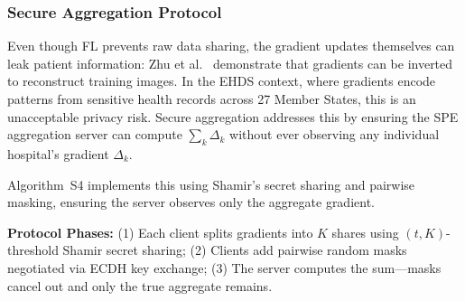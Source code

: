 \documentclass[conference]{IEEEtran}
\begin{document}
\subsubsection{Secure Aggregation Protocol}

Even though FL prevents raw data sharing, the gradient updates themselves can leak patient information: Zhu et al.~\cite{zhu2019deep} demonstrate that gradients can be inverted to reconstruct training images. In the EHDS context, where gradients encode patterns from sensitive health records across 27 Member States, this is an unacceptable privacy risk. Secure aggregation addresses this by ensuring the SPE aggregation server can compute $\sum_k \Delta_k$ without ever observing any individual hospital's gradient $\Delta_k$.

Algorithm~S4 implements this using Shamir's secret sharing and pairwise masking, ensuring the server observes only the aggregate gradient.

\textbf{Protocol Phases:} (1) Each client splits gradients into $K$ shares using $(t,K)$-threshold Shamir secret sharing; (2) Clients add pairwise random masks negotiated via ECDH key exchange; (3) The server computes the sum---masks cancel out and only the true aggregate remains.

\begin{figure}[htbp]
\centering
{}
\end{figure}
\end{document}
